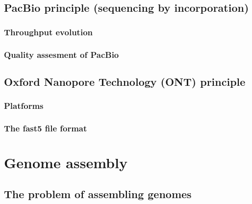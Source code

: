 \documentclass[
  letterpaper,
]{scrbook}
\begin{document}
\hypertarget{pacbio-principle-sequencing-by-incorporation}{%
\section*{PacBio principle (sequencing by
incorporation)}\label{pacbio-principle-sequencing-by-incorporation}}

\hypertarget{throughput-evolution}{%
\subsection*{Throughput evolution}\label{throughput-evolution}}

\hypertarget{quality-assesment-of-pacbio}{%
\subsection*{Quality assesment of
PacBio}\label{quality-assesment-of-pacbio}}

\hypertarget{oxford-nanopore-technology-ont-principle}{%
\section*{Oxford Nanopore Technology (ONT)
principle}\label{oxford-nanopore-technology-ont-principle}}

\hypertarget{platforms}{%
\subsection*{Platforms}\label{platforms}}

\hypertarget{the-fast5-file-format}{%
\subsection*{The fast5 file format}\label{the-fast5-file-format}}

\hypertarget{genome-assembly}{%
\chapter{Genome assembly}\label{genome-assembly}}

\hypertarget{the-problem-of-assembling-genomes}{%
\section*{The problem of assembling
genomes}\label{the-problem-of-assembling-genomes}}
\end{document}
